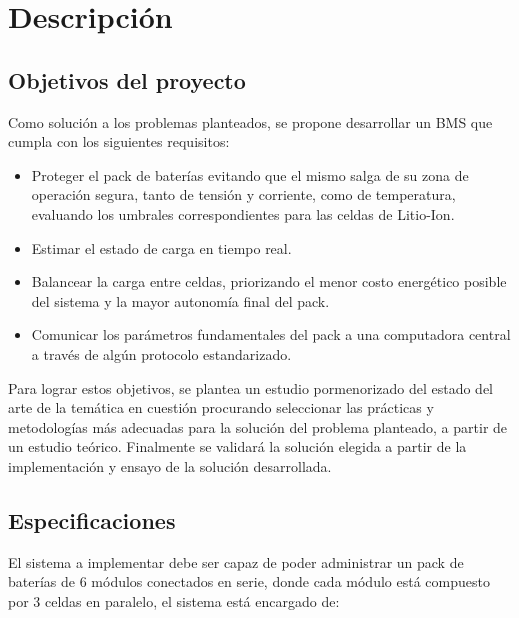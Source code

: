 \documentclass[10pt, a4paper]{report}
\begin{document}
\chapter{Descripci\'on}\label{descripcion}

\thispagestyle{fancy}

\section{Objetivos del proyecto}

Como solución a los problemas planteados, se propone desarrollar un
\acrshort{BMS} que cumpla con los siguientes requisitos:

\begin{itemize}
    \item Proteger el pack de baterías evitando que el mismo salga de su 
	zona de operación segura, tanto de tensión y corriente, como de 
	temperatura, evaluando los umbrales correspondientes para las celdas de 
    Litio-Ion.
    \item Estimar el estado de carga en tiempo real.
    \item Balancear la carga entre celdas, priorizando el menor costo 
	energético posible del sistema y la mayor autonomía final del pack.
    \item Comunicar los parámetros fundamentales del pack a una computadora 
	central a través de algún protocolo estandarizado.
\end{itemize}

\noindent Para lograr estos objetivos, se plantea un estudio pormenorizado 
del estado del arte de la temática en cuestión procurando seleccionar las 
prácticas y metodologías más adecuadas para la solución del problema 
planteado, a partir de un estudio teórico. Finalmente se validará la 
solución elegida a partir de la implementación y ensayo de la solución 
desarrollada.

\section{Especificaciones}\label{proy_specs}

\noindent El sistema a implementar debe ser capaz de poder administrar un 
pack de bater\'ias de 6 m\'odulos conectados en serie, donde cada módulo est\'a 
compuesto por 3 celdas en paralelo, el sistema está encargado de: 
\end{document}
